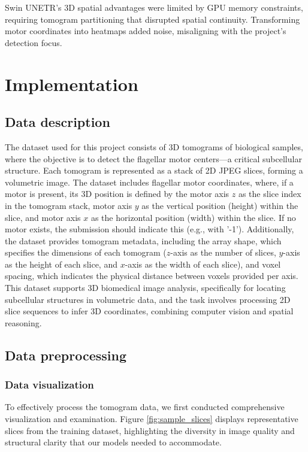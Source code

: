 \documentclass{article}
\begin{document}
Swin UNETR's 3D spatial advantages were limited by GPU memory constraints, requiring tomogram partitioning that disrupted spatial continuity. Transforming motor coordinates into heatmaps added noise, misaligning with the project's detection focus.


\section{Implementation}
\label{sec:impl}

\subsection{Data description}
The dataset\cite{byu-locating-bacterial-flagellar-motors-2025} used for this project consists of 3D tomograms of biological samples, where the objective is to detect the flagellar motor centers—a critical subcellular structure. Each tomogram is represented as a stack of 2D JPEG slices, forming a volumetric image. The dataset includes flagellar motor coordinates, where, if a motor is present, its 3D position is defined by the motor axis $z$ as the slice index in the tomogram stack, motor axis $y$ as the vertical position (height) within the slice, and motor axis $x$ as the horizontal position (width) within the slice. 
If no motor exists, the submission should indicate this (e.g., with '-1'). Additionally, the dataset provides tomogram metadata, including the array shape, which specifies the dimensions of each tomogram ($z$-axis as the number of slices, $y$-axis as the height of each slice, and $x$-axis as the width of each slice), and voxel spacing, which indicates the physical distance between voxels provided per axis. 
This dataset supports 3D biomedical image analysis, specifically for locating subcellular structures in volumetric data, and the task involves processing 2D slice sequences to infer 3D coordinates, combining computer vision and spatial reasoning.

\subsection{Data preprocessing}
\subsubsection{Data visualization}
To effectively process the tomogram data, we first conducted comprehensive visualization and examination.
Figure \ref{fig:sample_slices} displays representative slices from the training dataset, highlighting the diversity in image quality and structural clarity that our models needed to accommodate.
\end{document}
